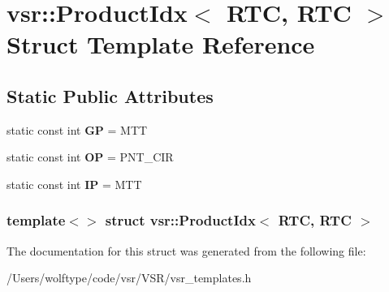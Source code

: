 \hypertarget{structvsr_1_1_product_idx_3_01_r_t_c_00_01_r_t_c_01_4}{\section{vsr\-:\-:Product\-Idx$<$ R\-T\-C, R\-T\-C $>$ Struct Template Reference}
\label{structvsr_1_1_product_idx_3_01_r_t_c_00_01_r_t_c_01_4}
}
\subsection*{Static Public Attributes}
\begin{DoxyCompactItemize}
\item 
\hypertarget{structvsr_1_1_product_idx_3_01_r_t_c_00_01_r_t_c_01_4_a42d868b786cfe1c8287dc1feb076b81f}{static const int {\bfseries G\-P} = M\-T\-T}\label{structvsr_1_1_product_idx_3_01_r_t_c_00_01_r_t_c_01_4_a42d868b786cfe1c8287dc1feb076b81f}

\item 
\hypertarget{structvsr_1_1_product_idx_3_01_r_t_c_00_01_r_t_c_01_4_a2976210e910cc1a8b2d7b28b8572bb8e}{static const int {\bfseries O\-P} = P\-N\-T\-\_\-\-C\-I\-R}\label{structvsr_1_1_product_idx_3_01_r_t_c_00_01_r_t_c_01_4_a2976210e910cc1a8b2d7b28b8572bb8e}

\item 
\hypertarget{structvsr_1_1_product_idx_3_01_r_t_c_00_01_r_t_c_01_4_a35c32c8c125c27b4a4ab2e71f13edfaf}{static const int {\bfseries I\-P} = M\-T\-T}\label{structvsr_1_1_product_idx_3_01_r_t_c_00_01_r_t_c_01_4_a35c32c8c125c27b4a4ab2e71f13edfaf}

\end{DoxyCompactItemize}
\subsubsection*{template$<$$>$ struct vsr\-::\-Product\-Idx$<$ R\-T\-C, R\-T\-C $>$}



The documentation for this struct was generated from the following file\-:\begin{DoxyCompactItemize}
\item 
/\-Users/wolftype/code/vsr/\-V\-S\-R/vsr\-\_\-templates.\-h\end{DoxyCompactItemize}
